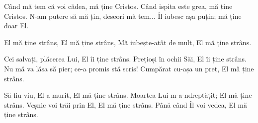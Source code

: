 \beginverse
Când mă tem că voi cădea, mă ține Cristos.
Când ispita este grea, mă ține Cristos.
N-am putere să mă țin, deseori mă tem...
Îl iubesc așa puțin; mă ține doar El.
\endverse

\beginchorus
El mă ține strâns,
El mă ține strâns,
Mă iubește-atât de mult,
El mă ține strâns.
\endchorus

\beginverse
Cei salvați, plăcerea Lui, El îi ține strâns.
Prețioși în ochii Săi, El îi ține strâns.
Nu mă va lăsa să pier; ce-a promis stă scris!
Cumpărat cu-așa un preț, El mă ține strâns.
\endverse

\beginverse
Să fiu viu, El a murit, El mă ține strâns.
Moartea Lui m-a-ndreptățit; El mă ține strâns.
Veșnic voi trăi prin El, El mă ține strâns.
Până când Îl voi vedea, El mă ține strâns.
\endverse
\endsong